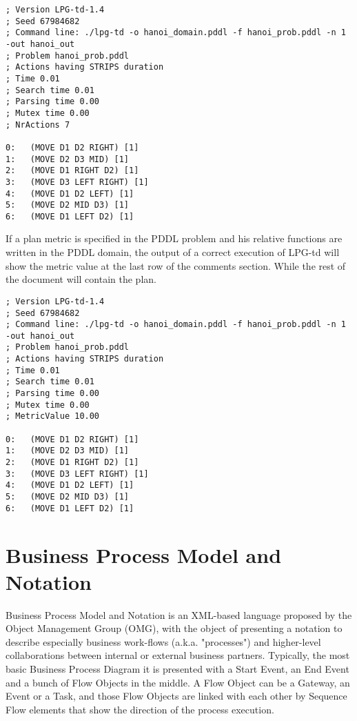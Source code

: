 \begin{lstlisting}[caption=An example of LPG-td plan]
; Version LPG-td-1.4
; Seed 67984682
; Command line: ./lpg-td -o hanoi_domain.pddl -f hanoi_prob.pddl -n 1 -out hanoi_out 
; Problem hanoi_prob.pddl
; Actions having STRIPS duration
; Time 0.01
; Search time 0.01
; Parsing time 0.00
; Mutex time 0.00
; NrActions 7

0:   (MOVE D1 D2 RIGHT) [1]
1:   (MOVE D2 D3 MID) [1]
2:   (MOVE D1 RIGHT D2) [1]
3:   (MOVE D3 LEFT RIGHT) [1]
4:   (MOVE D1 D2 LEFT) [1]
5:   (MOVE D2 MID D3) [1]
6:   (MOVE D1 LEFT D2) [1]
\end{lstlisting}


If a plan metric is specified in the PDDL problem and his relative functions are written in the PDDL domain, the output of a correct execution of LPG-td will show the metric value at the last row of the comments section. While the rest of the document will contain the plan. 

\begin{lstlisting}[caption=An example of LPG-td plan using metrics and numeric fluents.]
; Version LPG-td-1.4
; Seed 67984682
; Command line: ./lpg-td -o hanoi_domain.pddl -f hanoi_prob.pddl -n 1 -out hanoi_out 
; Problem hanoi_prob.pddl
; Actions having STRIPS duration
; Time 0.01
; Search time 0.01
; Parsing time 0.00
; Mutex time 0.00
; MetricValue 10.00

0:   (MOVE D1 D2 RIGHT) [1]
1:   (MOVE D2 D3 MID) [1]
2:   (MOVE D1 RIGHT D2) [1]
3:   (MOVE D3 LEFT RIGHT) [1]
4:   (MOVE D1 D2 LEFT) [1]
5:   (MOVE D2 MID D3) [1]
6:   (MOVE D1 LEFT D2) [1]
\end{lstlisting}


\section{Business Process Model and Notation}
\label{sec:context}
Business Process Model and Notation is an XML-based language proposed by the Object Management Group (OMG), with the object of presenting a notation to describe especially business work-flows (a.k.a. "processes") and higher-level collaborations between internal or external business partners. 
Typically, the most basic Business Process Diagram it is presented with a Start Event, an End Event and a bunch of Flow Objects in the middle. A Flow Object can be a Gateway, an Event or a Task, and those Flow Objects are linked with each other by Sequence Flow elements that show the direction of the process execution.

